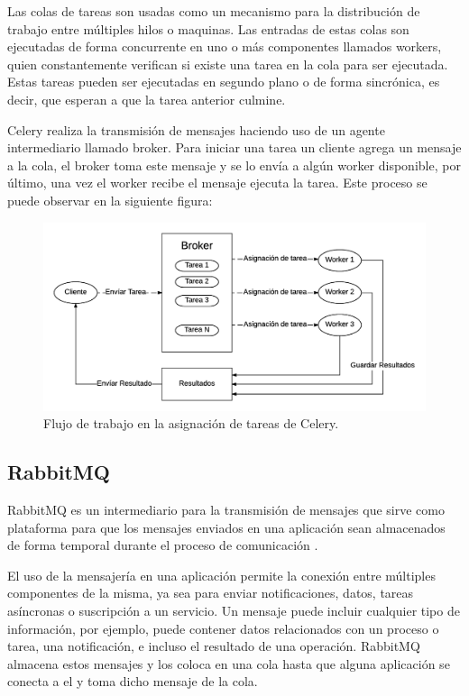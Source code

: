 Las colas de tareas son usadas como un mecanismo para la distribución de trabajo entre múltiples hilos o maquinas. Las entradas
de estas colas son ejecutadas de forma concurrente en uno o más componentes llamados workers, quien constantemente verifican
si existe una tarea en la cola para ser ejecutada. Estas tareas pueden ser ejecutadas en segundo plano o de forma sincrónica, 
es decir, que esperan a que la tarea anterior culmine.

Celery realiza la transmisión de mensajes haciendo uso de un agente intermediario llamado broker. Para iniciar una tarea un cliente
agrega un mensaje a la cola, el broker toma este mensaje y se lo envía a algún worker disponible, por último, una vez el worker
recibe el mensaje ejecuta la tarea. Este proceso se puede observar en la siguiente figura:

\begin{figure}[H]
	\centering
		\includegraphics[width=.9\textwidth]{figures/celery}
	\caption{Flujo de trabajo en la asignación de tareas de Celery.}
	\label{fig:celery}
\end{figure}

\subsection{RabbitMQ}

RabbitMQ es un intermediario para la transmisión de mensajes que sirve como plataforma para que los mensajes enviados
en una aplicación sean almacenados de forma temporal durante el proceso de comunicación \cite{14}.

El uso de la mensajería en una aplicación permite la conexión entre múltiples componentes de la misma, ya sea para enviar
notificaciones, datos, tareas asíncronas o suscripción a un servicio. Un mensaje puede incluir cualquier tipo de información, por ejemplo,
puede contener datos relacionados con un proceso o tarea, una notificación, e incluso el resultado de una operación. RabbitMQ
almacena estos mensajes y los coloca en una cola hasta que alguna aplicación se conecta a el y toma dicho mensaje de la cola.

